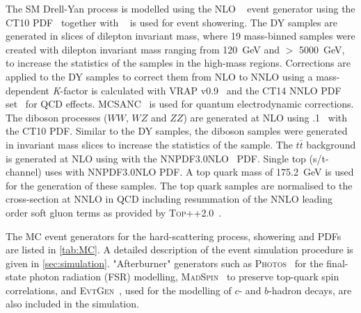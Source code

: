 The SM Drell-Yan process is modelled using the NLO \POWHEGBOX~\cite{Alioli:2010xd,Frixione:2007vw} event generator using the CT10 PDF~\cite{ct10} together with ~\cite{pythia8} is used for event showering. The DY samples are generated in slices of dilepton invariant mass, where 19 mass-binned samples were created with dilepton invariant mass ranging from \SI{120}{\giga\electronvolt} and $>$ \SI{5000}{\giga\electronvolt}, to increase the statistics of the samples in the high-mass regions. Corrections are applied to the DY samples to correct them from NLO to NNLO using a mass-dependent \emph{K}-factor is calculated with {\textsc{VRAP}} v0.9~\cite{vrap} and the CT14 NNLO PDF set~\cite{CT14} for QCD effects. {\textsc{MCSANC}}~\cite{MCSANC} is used for quantum electrodynamic corrections.  The diboson processes ($WW$, $WZ$ and $ZZ$) are generated at NLO using .1~\cite{Gleisberg:2008ta} with the CT10 PDF. Similar to the DY samples, the diboson samples were generated in invariant mass slices to increase the statistics of the sample. The $t\bar{t}$ background is generated at NLO using \POWHEGBOX with the NNPDF3.0NLO~\cite{Ball:2014uwa} PDF. Single top (s/t-channel) uses \POWHEGBOX with NNPDF3.0NLO PDF. A top quark mass of \SI{175.2}{\giga\electronvolt} is used for the generation of these samples. The top quark samples are normalised to the cross-section at NNLO in QCD including resummation of the NNLO leading order soft gluon terms as provided by \textsc{Top++}2.0~\cite{Czakon:2011xx}.

The MC event generators for the hard-scattering process, showering and PDFs are listed in \cref{tab:MC}. A detailed description of the event simulation procedure is given in \cref{sec:simulation}. "Afterburner" generators such as \textsc{Photos}~\cite{Golonka:2005pn} for the final-state photon radiation (FSR) modelling, \textsc{MadSpin}~\cite{Artoisenet:2012st} to preserve top-quark spin correlations, and \textsc{EvtGen}~\cite{Lange:2001uf}, used for the modelling of $c$- and $b$-hadron decays, are also included in the simulation.

